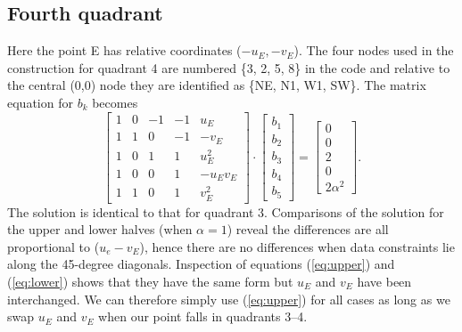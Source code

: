 \documentclass[12pt,letterpaper,margin=0.5in]{article}
\begin{document}
\subsection{Fourth quadrant}
Here the point E has relative coordinates ($-u_E, -v_E$).  The four nodes used in the
construction for quadrant 4 are numbered \{3, 2, 5, 8\} in the code and relative to the central (0,0) node they
are identified as \{NE, N1, W1, SW\}. The matrix equation for $b_k$ becomes
\begin{equation}
\left[ {\begin{array}{*{20}{r}}
1&0&{ - 1}&{ - 1}&{{u_E}}\\
1&1&0&{ - 1}&{ - {v_E}}\\
1&0&1&1&{u_E^2}\\
1&0&0&1&{ - {u_E}{v_E}}\\
1&1&0&1&{v_E^2}
\end{array}} \right] \cdot \left[ {\begin{array}{*{20}{c}}
{{b_1}}\\
{{b_2}}\\
{{b_3}}\\
{{b_4}}\\
{{b_5}}
\end{array}} \right] = \left[ {\begin{array}{*{20}{c}}
0\\
0\\
2\\
0\\
2\alpha^2
\end{array}} \right].
\end{equation}
The solution is identical to that for quadrant 3.
Comparisons of the solution for the upper and lower halves (when $\alpha = 1$) reveal the differences are all proportional to
($u_e - v_E$), hence there are no differences when data constraints lie along the 45-degree diagonals.
Inspection of equations (\ref{eq:upper}) and (\ref{eq:lower}) shows that they have the same form
but $u_E$ and $v_E$ have been interchanged.  We can therefore simply use (\ref{eq:upper}) for all cases
as long as we swap $u_E$ and $v_E$ when our point falls in quadrants 3--4.
\end{document}
